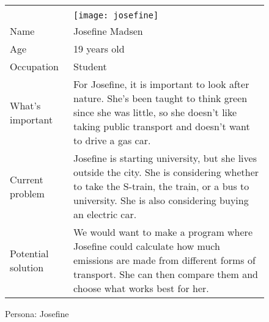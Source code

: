 \noindent
\begin{figure}[H]
    \centering
    \begin{tabularx}{\textwidth}{ | l X | }
        \hline
        &                                                  \\
        & \texttt{[image: josefine]} \\
        Name       & Josefine Madsen                                  \\
        Age        & 19 years old                                     \\
        Occupation & Student                                          \\
        What's important & For Josefine, it is important to look after nature.
        She's been taught to think green since she was little, so she doesn't like taking public transport and doesn't want
        to drive a gas car. \\
        Current problem & Josefine is starting university, but she lives outside the city.
        She is considering whether to take the S-train, the train, or a bus to university.
        She is also considering buying an electric car. \\
        Potential solution & We would want to make a program where Josefine could calculate how much emissions are
        made from different forms of transport.
        She can then compare them and choose what works best for her. \\
        \hline
    \end{tabularx}
    \caption{Persona: Josefine}
    \label{fig:persona_josefine}
\end{figure}

